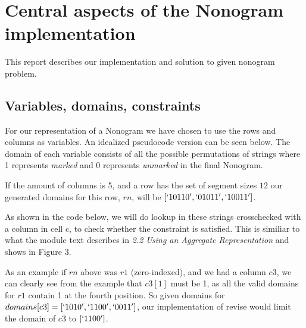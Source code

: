 
\section{Central aspects of the Nonogram implementation}
This report describes our implementation and solution to given nonogram problem.

\subsection{Variables, domains, constraints}
For our representation of a Nonogram we have chosen to
use the rows and columns as variables. An idealized pseudocode
version can be seen below. The domain of each variable consists
of all the possible permutations of strings where 1 represents
\emph{marked} and 0 represents \emph{unmarked} in the final Nonogram.

If the amount of columns is 5, and a row has the set of segment
sizes \({1 2}\) our generated domains for this row, \(rn\), will be
\([`10110', `01011', `10011']\).

As shown in the code below, we will do lookup in these strings
crosschecked with a column in cell c, to check whether the constraint
is satisfied. This is similiar to what the module text describes in
\emph{2.2 Using an Aggregate Representation} and shows in Figure 3.

As an example if \(rn\) above was \(r1\) (zero-indexed), and we had a column
\(c3\), we can clearly see from the example that \(c3[1]\) must be 1, as all the
valid domains for \(r1\) contain 1 at the fourth position. So given domains
for \(domains[c3] = [`1010', `1100', `0011']\), our implementation of revise
would limit the domain of \(c3\) to \([`1100']\).



